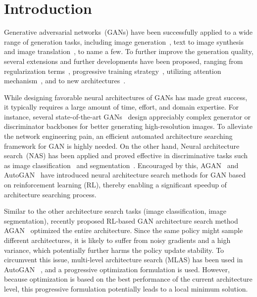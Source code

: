 \documentclass[runningheads]{llncs}
\begin{document}
\section{Introduction}
Generative adversarial networks~(GANs) have been successfully applied to a wide range of generation tasks, including image generation~\cite{goodfellow2014generative,brock2018large,bao2017cvae,wang2018high,guo2019auto}, text to image synthesis~\cite{reed2016generative,zhang2017stackgan,park2019semantic} and image translation~\cite{isola2017image,choi2018stargan}, to name a few. To further improve the generation quality, several extensions and further developments have been proposed, ranging from regularization terms~\cite{brock2016neural,gulrajani2017improved}, progressive training strategy~\cite{karras2017progressive}, utilizing attention mechanism~\cite{xu2018attngan,zhang2018self}, and to new architectures~\cite{karras2019style,brock2018large}.

While designing favorable neural architectures of GANs has made great success, it typically requires a large amount of time, effort, and domain expertise. For instance, several state-of-the-art GANs~\cite{karras2019style,brock2018large} design appreciably complex generator or discriminator backbones for better generating high-resolution images. To alleviate the network engineering pain, an efficient automated architecture searching framework for GAN is highly needed. On the other hand, Neural architecture search~(NAS) has been applied and proved effective in discriminative tasks such as image classification~\cite{krizhevsky2012imagenet} and segmentation~\cite{liu2019auto}. Encouraged by this,  AGAN~\cite{wang2019agan} and AutoGAN~\cite{gong2019autogan} have introduced neural architecture search methods for GAN based on reinforcement learning (RL), thereby enabling a significant speedup of architecture searching process. 


Similar to the other architecture search tasks (image classification, image segmentation), recently proposed RL-based GAN architecture search method AGAN~\cite{wang2019agan} optimized the entire architecture. Since the same policy might sample different architectures, it is likely to suffer from noisy gradients and a high variance, which potentially further harms the policy update stability. To circumvent this issue, multi-level architecture search
(MLAS) has been used in AutoGAN ~\cite{wang2019agan}, and a progressive optimization formulation is used. However, because optimization is based on the best performance of the current architecture level, this progressive formulation potentially leads to a local minimum solution. 
\end{document}
